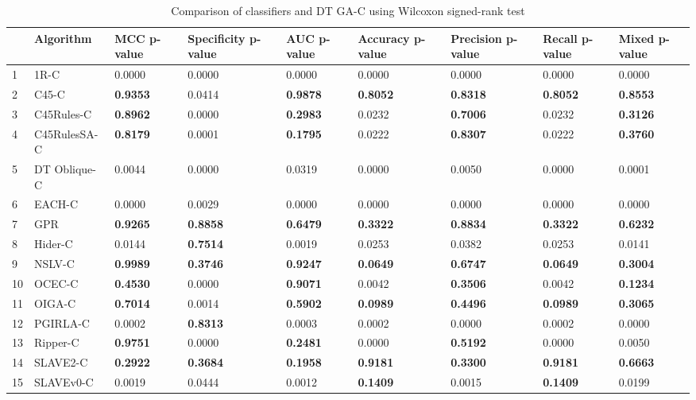 \begin{table}
\footnotesize
\caption{Comparison of classifiers and DT GA-C using Wilcoxon signed-rank test}
\label{tab:wilcoxon comparison}
\begin{tabular}{lllllllll}
\hline
 & Algorithm & MCC p-value & Specificity p-value & AUC p-value & Accuracy p-value & Precision p-value & Recall p-value & Mixed p-value \\
\hline
1 & 1R-C & 0.0000 & 0.0000 & 0.0000 & 0.0000 & 0.0000 & 0.0000 & 0.0000 \\
2 & C45-C & \textbf{0.9353} & 0.0414 & \textbf{0.9878} & \textbf{0.8052} & \textbf{0.8318} & \textbf{0.8052} & \textbf{0.8553} \\
3 & C45Rules-C & \textbf{0.8962} & 0.0000 & \textbf{0.2983} & 0.0232 & \textbf{0.7006} & 0.0232 & \textbf{0.3126} \\
4 & C45RulesSA-C & \textbf{0.8179} & 0.0001 & \textbf{0.1795} & 0.0222 & \textbf{0.8307} & 0.0222 & \textbf{0.3760} \\
5 & DT Oblique-C & 0.0044 & 0.0000 & 0.0319 & 0.0000 & 0.0050 & 0.0000 & 0.0001 \\
6 & EACH-C & 0.0000 & 0.0029 & 0.0000 & 0.0000 & 0.0000 & 0.0000 & 0.0000 \\
7 & GPR & \textbf{0.9265} & \textbf{0.8858} & \textbf{0.6479} & \textbf{0.3322} & \textbf{0.8834} & \textbf{0.3322} & \textbf{0.6232} \\
8 & Hider-C & 0.0144 & \textbf{0.7514} & 0.0019 & 0.0253 & 0.0382 & 0.0253 & 0.0141 \\
9 & NSLV-C & \textbf{0.9989} & \textbf{0.3746} & \textbf{0.9247} & \textbf{0.0649} & \textbf{0.6747} & \textbf{0.0649} & \textbf{0.3004} \\
10 & OCEC-C & \textbf{0.4530} & 0.0000 & \textbf{0.9071} & 0.0042 & \textbf{0.3506} & 0.0042 & \textbf{0.1234} \\
11 & OIGA-C & \textbf{0.7014} & 0.0014 & \textbf{0.5902} & \textbf{0.0989} & \textbf{0.4496} & \textbf{0.0989} & \textbf{0.3065} \\
12 & PGIRLA-C & 0.0002 & \textbf{0.8313} & 0.0003 & 0.0002 & 0.0000 & 0.0002 & 0.0000 \\
13 & Ripper-C & \textbf{0.9751} & 0.0000 & \textbf{0.2481} & 0.0000 & \textbf{0.5192} & 0.0000 & 0.0050 \\
14 & SLAVE2-C & \textbf{0.2922} & \textbf{0.3684} & \textbf{0.1958} & \textbf{0.9181} & \textbf{0.3300} & \textbf{0.9181} & \textbf{0.6663} \\
15 & SLAVEv0-C & 0.0019 & 0.0444 & 0.0012 & \textbf{0.1409} & 0.0015 & \textbf{0.1409} & 0.0199 \\
\hline
\end{tabular}
\end{table}
